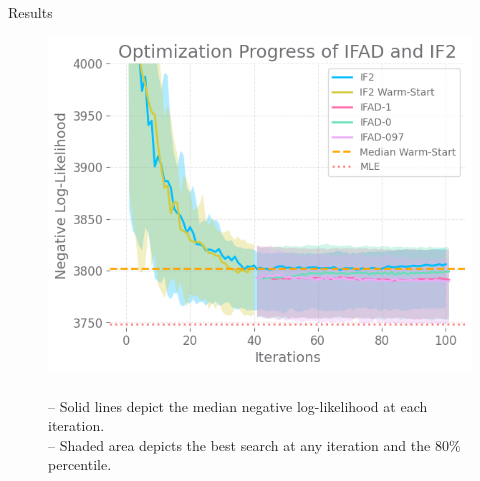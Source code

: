 \documentclass{beamer}
\begin{document}
\begin{frame}{Results}
\begin{figure}[htbp!]
    \centering
    \includegraphics[scale=0.5]{imgs/095/optim.png}
    \caption{\\
    -- Solid lines depict the median negative log-likelihood at each iteration.\\
    -- Shaded area depicts the best search at any iteration and the 80\% percentile.}
    \label{fig:optim}
\end{figure}
\end{frame}
\end{document}
